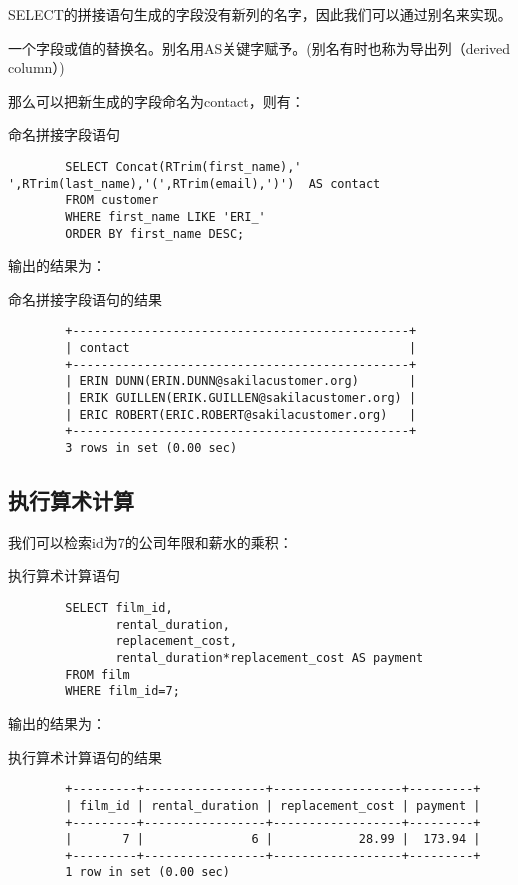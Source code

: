 \documentclass[UTF8]{article}
\begin{document}
SELECT的拼接语句生成的字段没有新列的名字，因此我们可以通过别名来实现。
\begin{redbox}[frametitle={Defination 10.2 别名（alias）}]
        一个字段或值的替换名。别名用AS关键字赋予。(别名有时也称为导出列（derived column）)
\end{redbox}

那么可以把新生成的字段命名为contact，则有：
\begin{listing}[H]
	\caption{命名拼接字段语句}
	\label{code:renameconcatfield}
\begin{verbatim}
        SELECT Concat(RTrim(first_name),' ',RTrim(last_name),'(',RTrim(email),')')  AS contact
        FROM customer 
        WHERE first_name LIKE 'ERI_'
        ORDER BY first_name DESC;
\end{verbatim}
\end{listing}

输出的结果为：

\begin{listing}[H]
	\caption{命名拼接字段语句的结果}
	\label{code:renameconcatfieldresult}
\begin{verbatim}
        +-----------------------------------------------+
        | contact                                       |
        +-----------------------------------------------+
        | ERIN DUNN(ERIN.DUNN@sakilacustomer.org)       |
        | ERIK GUILLEN(ERIK.GUILLEN@sakilacustomer.org) |
        | ERIC ROBERT(ERIC.ROBERT@sakilacustomer.org)   |
        +-----------------------------------------------+
        3 rows in set (0.00 sec)
\end{verbatim}
\end{listing}

\subsection{执行算术计算}
我们可以检索id为7的公司年限和薪水的乘积：
\begin{listing}[H]
	\caption{执行算术计算语句}
	\label{code:conductcalculationclause}
\begin{verbatim}
        SELECT film_id,
               rental_duration,
               replacement_cost,
               rental_duration*replacement_cost AS payment 
        FROM film 
        WHERE film_id=7;
\end{verbatim}
\end{listing}

输出的结果为：

\begin{listing}[H]
	\caption{执行算术计算语句的结果}
	\label{code:conductcalculationclauseresult}
\begin{verbatim}
        +---------+-----------------+------------------+---------+
        | film_id | rental_duration | replacement_cost | payment |
        +---------+-----------------+------------------+---------+
        |       7 |               6 |            28.99 |  173.94 |
        +---------+-----------------+------------------+---------+
        1 row in set (0.00 sec)
\end{verbatim}
\end{listing}
\end{document}
